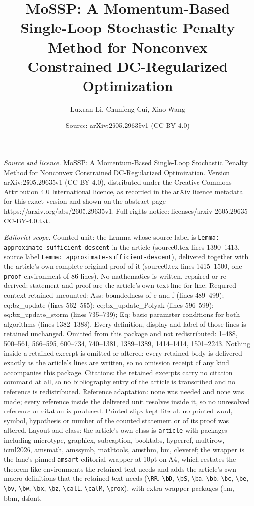 \documentclass[10pt,a4paper]{amsart}
\title[MoSSP: A Momentum-Based Single-Loop Stochastic Penalty Metho]{MoSSP: A Momentum-Based Single-Loop Stochastic Penalty Method for Nonconvex Constrained DC-Regularized Optimization}
\author{Luxuan Li, Chunfeng Cui, Xiao Wang}
\date{Source: arXiv:2605.29635v1 (CC BY 4.0)}
\begin{document}
\maketitle

\noindent\emph{Source and licence.} MoSSP: A Momentum-Based Single-Loop Stochastic Penalty Method for Nonconvex Constrained DC-Regularized Optimization. Version arXiv:2605.29635v1 (CC BY 4.0), distributed under the Creative Commons Attribution 4.0 International licence, as recorded in the arXiv licence metadata for this exact version and shown on the abstract page https://arxiv.org/abs/2605.29635v1. Full rights notice: licenses/arxiv-2605.29635-CC-BY-4.0.txt.\par\smallskip

\noindent\textit{Editorial scope.} Counted unit: the Lemma whose source label is \texttt{Lemma: approximate-sufficient-descent} in the article (source0.tex lines 1390--1413, source label \texttt{Lemma: approximate-sufficient-descent}), delivered together with the article's own complete original proof of it (source0.tex lines 1415--1500, one \texttt{proof} environment of 86 lines). No mathematics is written, repaired or re-derived: statement and proof are the article's own text line for line. Required context retained uncounted: Ass: boundedness of c and f (lines 489--499); eq:bz\_update (lines 562--565); eq:bx\_update\_Polyak (lines 596--599); eq:bx\_update\_storm (lines 735--739); Eq: basic parameter conditions for both algorithms (lines 1382--1388). Every definition, display and label of those lines is retained unchanged. Omitted from this package and not redistributed: 1--488, 500--561, 566--595, 600--734, 740--1381, 1389--1389, 1414--1414, 1501--2243. Nothing inside a retained excerpt is omitted or altered: every retained body is delivered exactly as the article's lines are written, so no omission receipt of any kind accompanies this package. Citations: the retained excerpts carry no citation command at all, so no bibliography entry of the article is transcribed and no reference is redistributed. Reference adaptation: none was needed and none was made; every reference inside the delivered unit resolves inside it, so no unresolved reference or citation is produced. Printed slips kept literal: no printed word, symbol, hypothesis or number of the counted statement or of its proof was altered. Layout and class: the article's own class is \texttt{article} with packages including microtype, graphicx, subcaption, booktabs, hyperref, multirow, icml2026, amsmath, amssymb, mathtools, amsthm, bm, cleveref; the wrapper is the lane's pinned \texttt{amsart} editorial wrapper at 10pt on A4, which restates the theorem-like environments the retained text needs and adds the article's own macro definitions that the retained text needs (\texttt{\textbackslash RR}, \texttt{\textbackslash bD}, \texttt{\textbackslash bS}, \texttt{\textbackslash ba}, \texttt{\textbackslash bb}, \texttt{\textbackslash bc}, \texttt{\textbackslash be}, \texttt{\textbackslash bv}, \texttt{\textbackslash bw}, \texttt{\textbackslash bx}, \texttt{\textbackslash bz}, \texttt{\textbackslash calL}, \texttt{\textbackslash calM}, \texttt{\textbackslash prox}), with extra wrapper packages (bm, bbm, dsfont, 
\end{document}

